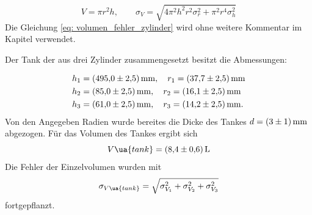 \begin{equation}
  \label{eq: volumen_fehler_zylinder}
  V=\pi r^2 h, \qquad \sigma_{V}=\sqrt{4 \pi^{2} h^{2} r^{2} \sigma_{r}^{2}  + \pi^{2} r^{4} \sigma_{h}^{2} }
\end{equation}
Die Gleichung \ref{eq: volumen_fehler_zylinder} wird ohne weitere Kommentar im Kapitel verwendet.

Der Tank der aus drei Zylinder zusammengesetzt besitzt die Abmessungen:

\begin{align*}
h_1&=\SI{495 \pm 2.5}{\milli\meter}, \quad r_1=\SI{37.7\pm2.5}{\milli\meter} \\
h_2&=\SI{85 \pm 2.5}{\milli\meter}, \quad r_2=\SI{16.1\pm 2.5}{\milli\meter} \\
h_3&=\SI{61 \pm 2.5}{\milli\meter}, \quad r_3=\SI{14.2\pm 2.5}{\milli\meter}. \\
\end{align*}
Von den Angegeben Radien wurde bereites die Dicke des Tankes $d=\SI{3\pm1}{\milli\meter}$ abgezogen.
Für das Volumen des Tankes ergibt sich
\begin{equation}
  \label{eq:volumen Tank}
  V\ua{tank}=\SI{8.4\pm0.6}{\litre}
\end{equation}
Die Fehler der Einzelvolumen wurden mit
\begin{equation}
  \label{eq:fehler_addi}
  \sigma_{V\ua{tank}}=\sqrt{\sigma_{V_{1}}^{2} + \sigma_{V_{2}}^{2}+\sigma_{V_{3}}^{2}}
\end{equation}
fortgepflanzt.


